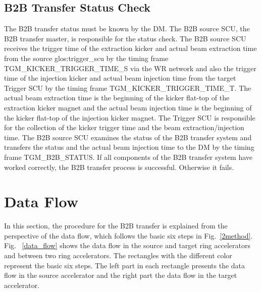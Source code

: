 %

\subsection{B2B Transfer Status Check}
The B2B transfer status must be known by the DM. The B2B source SCU, the B2B transfer master, is responsible for the status check. The B2B source SCU receives the trigger time of the extraction kicker and actual beam extraction time from the source \gls{glos:trigger_scu} by the timing frame TGM\_KICKER\_TRIGGER\_TIME\_S via the WR network and also the trigger time of the injection kicker and actual beam injection time from the target Trigger SCU by the timing frame TGM\_KICKER\_TRIGGER\_TIME\_T. The actual beam extraction time is the beginning of the kicker flat-top of the extraction kicker magnet and the actual beam injection time is the beginning of the kicker flat-top of the injection kicker magnet. The Trigger SCU is responsible for the collection of the kicker trigger time and the beam extraction/injection time. The B2B source SCU examines the status of the B2B transfer system and transfers the status and the actual beam injection time to the DM by the timing frame TGM\_B2B\_STATUS. If all components of the B2B transfer system have worked correctly, the B2B transfer process is successful. Otherwise it fails. 

\section{Data Flow}
\label{cpt_data}
In this section, the procedure for the B2B transfer is explained from the perspective of the data flow, which follows the basic six steps in Fig.~\ref{2method}. Fig. ~\ref{data_flow} shows the data flow in the source and target ring accelerators and between two ring accelerators. The rectangles with the different color represent the basic six steps. The left part in each rectangle presents the data flow in the source accelerator and the right part the data flow in the target accelerator.


